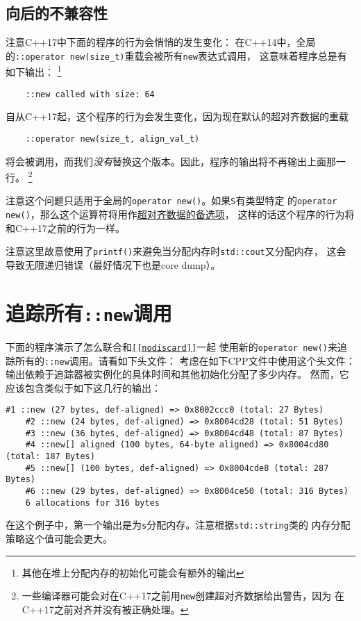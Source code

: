 \subsection{向后的不兼容性}
注意C++17中下面的程序的行为会悄悄的发生变化：
在C++14中，全局的\texttt{::operator new(size\_t)}重载会被所有\texttt{new}表达式调用，
这意味着程序总是有如下输出：
\footnote{其他在堆上分配内存的初始化可能会有额外的输出}
\begin{lstlisting}
    ::new called with size: 64
\end{lstlisting}
自从C++17起，这个程序的行为会发生变化，因为现在默认的超对齐数据的重载
\begin{lstlisting}
    ::operator new(size_t, align_val_t)
\end{lstlisting}
将会被调用，而我们\emph{没有}替换这个版本。因此，程序的输出将不再输出上面那一行。
\footnote{一些编译器可能会对在C++17之前用\texttt{new}创建超对齐数据给出警告，因为
在C++17之前对齐并没有被正确处理。}

注意这个问题只适用于全局的\texttt{operator new()}。如果\texttt{S}有类型特定
的\texttt{operator new()}，那么这个运算符将用作\hyperref[ch30.2.2.2]{超对齐数据的备选项}，
这样的话这个程序的行为将和C++17之前的行为一样。

注意这里故意使用了\texttt{printf()}来避免当分配内存时\texttt{std::cout}又分配内存，
这会导致无限递归错误（最好情况下也是core dump）。


\section{追踪所有\texttt{::new}调用}\label{ch30.4}
下面的程序演示了怎么联合和\hyperref[ch7.1]{\texttt{[[nodiscard]]}}一起
使用新的\texttt{operator new()}来追踪所有的\texttt{::new}调用。请看如下头文件：
考虑在如下CPP文件中使用这个头文件：
输出依赖于追踪器被实例化的具体时间和其他初始化分配了多少内存。
然而，它应该包含类似于如下这几行的输出：
\begin{lstlisting}[keywordstyle=\color{black}]
    #1 ::new (27 bytes, def-aligned) => 0x8002ccc0 (total: 27 Bytes)
    #2 ::new (24 bytes, def-aligned) => 0x8004cd28 (total: 51 Bytes)
    #3 ::new (36 bytes, def-aligned) => 0x8004cd48 (total: 87 Bytes)
    #4 ::new[] aligned (100 bytes, 64-byte aligned) => 0x8004cd80 (total: 187 Bytes)
    #5 ::new[] (100 bytes, def-aligned) => 0x8004cde8 (total: 287 Bytes)
    #6 ::new (29 bytes, def-aligned) => 0x8004ce50 (total: 316 Bytes)
    6 allocations for 316 bytes
\end{lstlisting}
在这个例子中，第一个输出是为\texttt{s}分配内存。注意根据\texttt{std::string}类的
内存分配策略这个值可能会更大。


